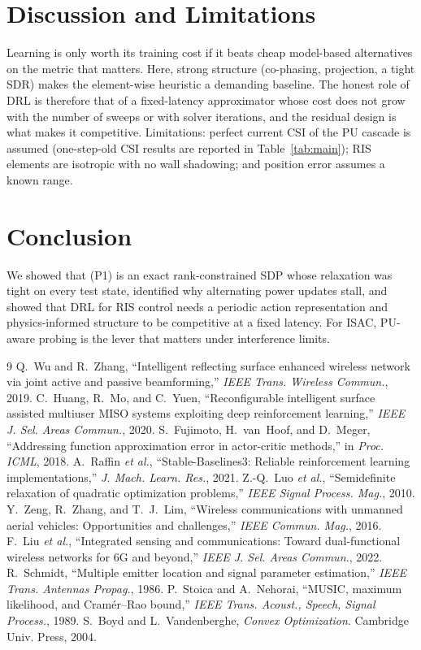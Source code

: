 \documentclass[conference]{IEEEtran}
\begin{document}
\section{Discussion and Limitations}
Learning is only worth its training cost if it beats cheap model-based alternatives on the metric that matters. Here, strong structure (co-phasing, projection, a tight SDR) makes the element-wise heuristic a demanding baseline. The honest role of DRL is therefore that of a fixed-latency approximator whose cost does not grow with the number of sweeps or with solver iterations, and the residual design is what makes it competitive. Limitations: perfect current CSI of the PU cascade is assumed (one-step-old CSI results are reported in Table~\ref{tab:main}); RIS elements are isotropic with no wall shadowing; and position error assumes a known range.

\section{Conclusion}
We showed that (P1) is an exact rank-constrained SDP whose relaxation was tight on every test state, identified why alternating power updates stall, and showed that DRL for RIS control needs a periodic action representation and physics-informed structure to be competitive at a fixed latency. For ISAC, PU-aware probing is the lever that matters under interference limits.

\begin{thebibliography}{9}\footnotesize
{} Q.~Wu and R.~Zhang, ``Intelligent reflecting surface enhanced wireless network via joint active and passive beamforming,'' \emph{IEEE Trans. Wireless Commun.}, 2019.
 C.~Huang, R.~Mo, and C.~Yuen, ``Reconfigurable intelligent surface assisted multiuser MISO systems exploiting deep reinforcement learning,'' \emph{IEEE J. Sel. Areas Commun.}, 2020.
 S.~Fujimoto, H.~van~Hoof, and D.~Meger, ``Addressing function approximation error in actor-critic methods,'' in \emph{Proc. ICML}, 2018.
 A.~Raffin \emph{et al.}, ``Stable-Baselines3: Reliable reinforcement learning implementations,'' \emph{J. Mach. Learn. Res.}, 2021.
 Z.-Q.~Luo \emph{et al.}, ``Semidefinite relaxation of quadratic optimization problems,'' \emph{IEEE Signal Process. Mag.}, 2010.
 Y.~Zeng, R.~Zhang, and T.~J.~Lim, ``Wireless communications with unmanned aerial vehicles: Opportunities and challenges,'' \emph{IEEE Commun. Mag.}, 2016.
 F.~Liu \emph{et al.}, ``Integrated sensing and communications: Toward dual-functional wireless networks for 6G and beyond,'' \emph{IEEE J. Sel. Areas Commun.}, 2022.
 R.~Schmidt, ``Multiple emitter location and signal parameter estimation,'' \emph{IEEE Trans. Antennas Propag.}, 1986.
 P.~Stoica and A.~Nehorai, ``MUSIC, maximum likelihood, and Cram\'er--Rao bound,'' \emph{IEEE Trans. Acoust., Speech, Signal Process.}, 1989.
 S.~Boyd and L.~Vandenberghe, \emph{Convex Optimization}. Cambridge Univ. Press, 2004.
\end{thebibliography}
\end{document}
